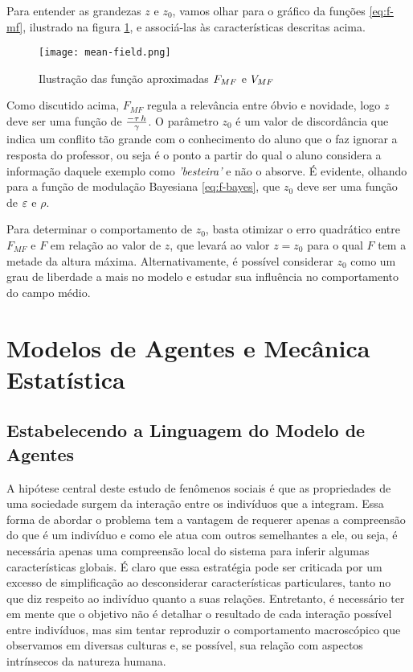 Para entender as grandezas $z$ e $z_0$, vamos olhar para o gráfico da funções \eqref{eq:f-mf}, ilustrado na figura \ref{fig:mf-func}, e associá-las às características descritas acima.
\begin{figure}[h!]\label{fig:mf-func}
    \centering
    \texttt{[image: mean-field.png]}
    \caption{Ilustração das função aproximadas $F_{MF}$ e $V_{MF}$}
\end{figure}

Como discutido acima, $F_{MF}$ regula a relevância entre óbvio e novidade, logo $z$ deve ser uma função de $\frac{-\tau\,h}{\gamma}$.
O parâmetro $z_0$ é um valor de discordância que indica um conflito tão grande com o conhecimento do aluno que o faz ignorar a resposta do professor, ou seja é o ponto a partir do qual o aluno considera a informação daquele exemplo como \emph{'besteira'} e não o absorve.
É evidente, olhando para a função de modulação Bayesiana \eqref{eq:f-bayes}, que $z_0$ deve ser uma função de $\varepsilon$ e $\rho$.

Para determinar o comportamento de $z_0$, basta otimizar o erro quadrático entre $F_{MF}$ e $F$ em relação ao valor de $z$, que levará ao valor $z=z_0$ para o qual $F$ tem a metade da altura máxima.
Alternativamente, é possível considerar $z_0$ como um grau de liberdade a mais no modelo e estudar sua influência no comportamento do campo médio.

\section{Modelos de Agentes e Mecânica Estatística}
\label{sec:AMSM}

\subsection{Estabelecendo a Linguagem do Modelo de Agentes}\label{ssec:AMSM1}
A hipótese central deste estudo de fenômenos sociais é que as propriedades de uma sociedade surgem da interação entre os indivíduos que a integram.
Essa forma de abordar o problema tem a vantagem de requerer apenas a compreensão do que é um indivíduo e como ele atua com outros semelhantes a ele, ou seja, é necessária apenas uma compreensão local do sistema para inferir algumas características globais.
É claro que essa estratégia pode ser criticada por um excesso de simplificação ao desconsiderar características particulares, tanto no que diz respeito ao indivíduo quanto a suas relações.
Entretanto, é necessário ter em mente que o objetivo não é detalhar o resultado de cada interação possível entre indivíduos, mas sim tentar reproduzir o comportamento macroscópico que observamos em diversas culturas e, se possível, sua relação com aspectos intrínsecos da natureza humana.

